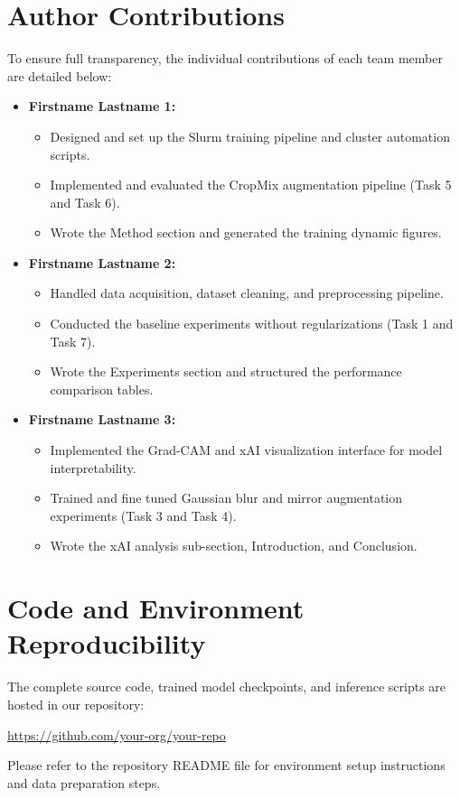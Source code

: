 \clearpage
\appendix

\section{Author Contributions}
\label{sec:contributions}

To ensure full transparency, the individual contributions of each team member are detailed below:

\begin{itemize}
    \item \textbf{Firstname Lastname 1:} 
    \begin{itemize}
        \item Designed and set up the Slurm training pipeline and cluster automation scripts.
        \item Implemented and evaluated the CropMix augmentation pipeline (Task 5 and Task 6).
        \item Wrote the Method section and generated the training dynamic figures.
    \end{itemize}
    
    \item \textbf{Firstname Lastname 2:} 
    \begin{itemize}
        \item Handled data acquisition, dataset cleaning, and preprocessing pipeline.
        \item Conducted the baseline experiments without regularizations (Task 1 and Task 7).
        \item Wrote the Experiments section and structured the performance comparison tables.
    \end{itemize}
    
    \item \textbf{Firstname Lastname 3:} 
    \begin{itemize}
        \item Implemented the Grad-CAM and xAI visualization interface for model interpretability.
        \item Trained and fine tuned Gaussian blur and mirror augmentation experiments (Task 3 and Task 4).
        \item Wrote the xAI analysis sub-section, Introduction, and Conclusion.
    \end{itemize}
\end{itemize}

\section{Code and Environment Reproducibility}
\label{sec:code_reproducibility}

The complete source code, trained model checkpoints, and inference scripts are hosted in our repository:
\begin{center}
    \url{https://github.com/your-org/your-repo}
\end{center}
Please refer to the repository README file for environment setup instructions and data preparation steps.